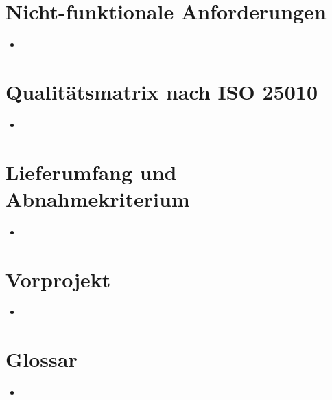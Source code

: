 \documentclass[11pt,a4paper]{scrreprt}
\begin{document}
\chapter{Nicht-funktionale Anforderungen}
\begin{itemize}
\item
\end{itemize}
\chapter{Qualitätsmatrix nach ISO 25010}
\begin{itemize}
\item
\end{itemize}
\chapter{Lieferumfang und Abnahmekriterium}
\begin{itemize}
\item
\end{itemize}
\chapter{Vorprojekt}
\begin{itemize}
\item
\end{itemize}
\chapter{Glossar}
\begin{itemize}
\item
\end{itemize}
\end{document}
